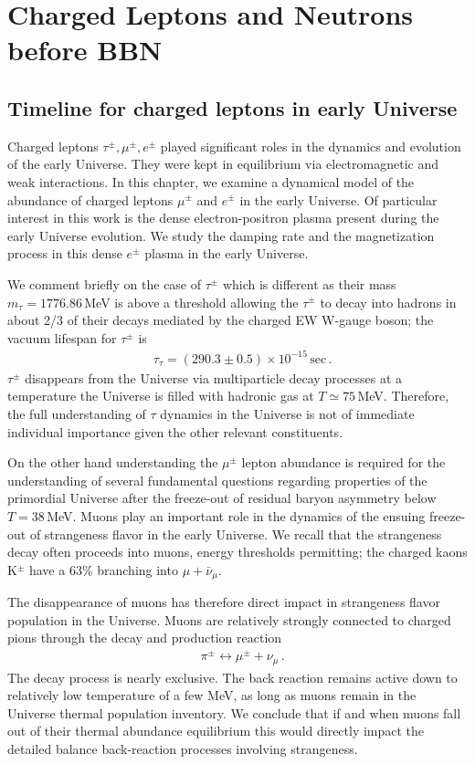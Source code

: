 \section{Charged Leptons and Neutrons before BBN} 
\subsection{Timeline for charged leptons in early Universe}\label{Electron}
Charged leptons $\tau^\pm,\mu^\pm,e^\pm$ played significant roles in the dynamics and evolution of the early Universe. They were kept in equilibrium via electromagnetic and weak interactions.  In this chapter, we examine a dynamical model of the abundance of charged leptons $\mu^\pm$ and $e^\pm$ in the early Universe.  Of particular interest in this work is the dense electron-positron plasma present during the early Universe evolution. We study the damping rate and the magnetization process in this dense $e^\pm$ plasma in the early Universe.

We comment briefly on the case of $\tau^\pm$ which is different as their mass $m_\tau=1776.86$\,MeV is above a threshold allowing the $\tau^\pm$ to decay into hadrons in about 2/3 of their decays mediated by the charged EW  W-gauge boson; the vacuum lifespan for $\tau^\pm$ is~\cite{ParticleDataGroup:2022pth}
\begin{align}
&\tau_{\tau}=(290.3\pm0.5)\times10^{-15}\,\mathrm{sec}\,.
\end{align}
$\tau^\pm$ disappears from the Universe via multiparticle decay processes at a temperature the Universe is filled with hadronic gas at $T\simeq 75$\,MeV. Therefore, the full understanding of $\tau$ dynamics in the Universe is not of immediate individual importance given the other relevant constituents.

On the other hand understanding the $\mu^\pm$ lepton abundance is required for the understanding of several fundamental questions regarding properties of the primordial Universe after the freeze-out of residual baryon asymmetry below $T=38$\,MeV. Muons play an important role in the dynamics of the ensuing freeze-out of strangeness flavor in the early Universe. We recall that the strangeness decay often proceeds into muons, energy thresholds permitting;  the charged kaons K$^\pm$ have a 63\% branching into $\mu+\bar \nu_\mu$. 

The disappearance of muons has therefore direct impact in strangeness flavor population in the Universe. Muons are relatively strongly connected to charged pions through the decay and production reaction 
\begin{align}
&\pi^\pm\leftrightarrow \mu^\pm+\nu_\mu\,.
\end{align}
The decay process is nearly exclusive. The back reaction remains active down to relatively low temperature of a few MeV, as long as muons remain in the Universe thermal population inventory.  We conclude that if and when  muons fall out of their thermal abundance equilibrium this would directly impact the detailed balance back-reaction processes involving strangeness.  

